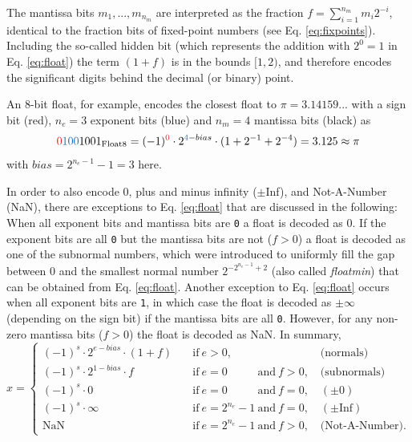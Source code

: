 The mantissa bits $m_1,...,m_{n_m}$ are interpreted as the fraction $f = \sum_{i=1}^{n_m} m_i 2^{-i}$, identical to the fraction bits
of fixed-point numbers (see Eq. \ref{eq:fixpoints}). Including the so-called hidden bit (which represents the addition with $2^0 = 1$
in Eq. \ref{eq:float}) the term $(1+f)$ is in the bounds $[1,2)$, and therefore encodes the significant digits behind the decimal (or binary)
point.

An 8-bit float, for example, encodes the closest float to $\pi = 3.14159...$ with a sign bit (red), $n_e = 3$ exponent bits (blue) and
$n_m=4$ mantissa bits (black) as
\begin{equation}
{\color{psign}0}{\color{pexpo}100}1001_{\op{Float8}} = (-1)^{\color{psign}0} \cdot 2^{{\color{pexpo}4}-bias}
\cdot (1+2^{-1}+2^{-4}) = 3.125 \approx \pi
\label{eq:float8}
\end{equation}
with $bias=2^{n_e-1} - 1 = 3$ here.

In order to also encode 0, plus and minus infinity ($\pm$Inf), and Not-A-Number (NaN), there are exceptions to Eq. \ref{eq:float} that
are discussed in the following: When all exponent bits and mantissa bits are \texttt{0} a float is decoded as 0. If the exponent bits are
all \texttt{0} but the mantissa bits are not ($f>0$) a float is decoded as one of the subnormal numbers, which were introduced to uniformly
fill the gap between 0 and the smallest normal number $2^{-2^{n_e-1}+2}$ (also called \emph{floatmin}) that can be obtained from
Eq. \ref{eq:float}. Another exception to Eq. \ref{eq:float} occurs when all exponent bits are \texttt{1}, in which case the float is decoded
as $\pm \infty$ (depending on the sign bit) if the mantissa bits are all \texttt{0}. However, for any non-zero mantissa bits ($f>0$) the float is
decoded as NaN. In summary,
\begin{equation}
x = \begin{cases}
(-1)^s \cdot 2^{e-bias} \cdot (1+f) \quad &\text{if}~e > 0,\phantom{^{n_e}-1~\text{and}~f > 0} \quad \text{(normals)} \\
(-1)^s \cdot 2^{1-bias} \cdot f \quad &\text{if}~e=0\phantom{^{n_e}-1}~\text{and}~f > 0, \quad \text{(subnormals)} \\
(-1)^s \cdot 0 \quad &\text{if}~e=0\phantom{^{n_e}-1}~\text{and}~f = 0, \quad (\pm 0) \\
(-1)^s \cdot \infty \quad &\text{if}~e=2^{n_e}-1~\text{and}~f = 0, \quad (\pm \text{Inf}) \\
\text{NaN} \quad &\text{if}~e=2^{n_e}-1~\text{and}~f > 0, \quad \text{(Not-A-Number).}
\end{cases}
\label{eq:float_all}
\end{equation}

